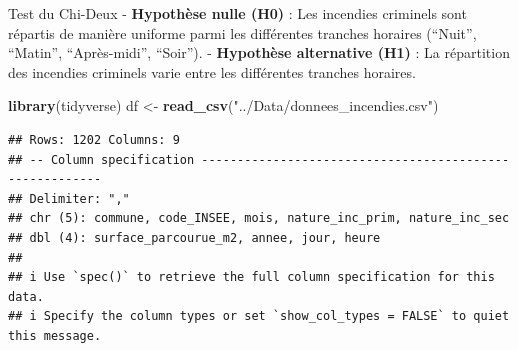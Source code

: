 \documentclass[
]{article}
\newenvironment{Shaded}{\begin{snugshade}}{\end{snugshade}}
\newcommand{\FunctionTok}[1]{\textcolor[rgb]{0.13,0.29,0.53}{\textbf{#1}}}
\newcommand{\NormalTok}[1]{#1}
\newcommand{\OtherTok}[1]{\textcolor[rgb]{0.56,0.35,0.01}{#1}}
\newcommand{\StringTok}[1]{\textcolor[rgb]{0.31,0.60,0.02}{#1}}
\begin{document}
Test du Chi-Deux - \textbf{Hypothèse nulle (H0)} : Les incendies
criminels sont répartis de manière uniforme parmi les différentes
tranches horaires (``Nuit'', ``Matin'', ``Après-midi'', ``Soir''). -
\textbf{Hypothèse alternative (H1)} : La répartition des incendies
criminels varie entre les différentes tranches horaires.

\begin{Shaded}
\begin{Highlighting}[]
\FunctionTok{library}\NormalTok{(tidyverse)}
\NormalTok{df }\OtherTok{\textless{}{-}} \FunctionTok{read\_csv}\NormalTok{(}\StringTok{"../Data/donnees\_incendies.csv"}\NormalTok{)}
\end{Highlighting}
\end{Shaded}

\begin{verbatim}
## Rows: 1202 Columns: 9
## -- Column specification --------------------------------------------------------
## Delimiter: ","
## chr (5): commune, code_INSEE, mois, nature_inc_prim, nature_inc_sec
## dbl (4): surface_parcourue_m2, annee, jour, heure
## 
## i Use `spec()` to retrieve the full column specification for this data.
## i Specify the column types or set `show_col_types = FALSE` to quiet this message.
\end{verbatim}
\end{document}
